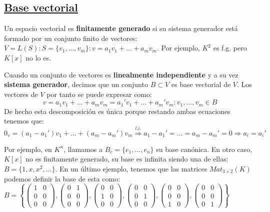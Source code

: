 \documentclass[10pt,a4paper,openright]{book}
\begin{document}
\subsection*{\underline{Base vectorial}}
Un espacio vectorial es \textbf{finitamente generado} si su sistema generador está formado por un conjunto finito de vectores: $V=L(S): S=\{v_1, ..., v_m\}: v=a_1v_1+ ... + a_mv_m$. Por ejemplo, $K^2$ es f.g. pero $K[x]$ no lo es.\par

Cuando un conjunto de vectores es \textbf{linealmente independiente} y a su vez \textbf{sistema generador}, decimos que un conjunto $B\subset V$ es base vectorial de $V$. Los vectores de $V$ por tanto se puede expresar como:
$$v=a_1v_1+...+a_mv_m=a_1'v_1+...+a_m'v_m: v_1, ..., v_m\in B$$
De hecho esta descomposición es única porque restando ambas ecuaciones tenemos que:
$$0_v=(a_1-a_1')v_1+...+(a_m-a_m')v_m\stackrel{l.i.}{\Rightarrow} a_1-a_1'=...=a_m-a_m'=0\Rightarrow a_i=a_i'$$

Por ejemplo, en $K^n$, llamamos a $B_c=\{e_1, ..., e_n\}$ su base canónica. En otro caso, $K[x]$ no es finitamente generado, su base es infinita siendo una de ellas: $B=\{1, x, x^2, ...\}$. En un último ejemplo, tenemos que las matrices $Mat_{3\times 2}(K)$ podemos definir la base de esta como: $B=\left\lbrace\left(\begin{array}{cc}1 & 0 \\ 0 & 0 \\ 0 & 0 \end{array}\right), \left(\begin{array}{cc}0 & 1 \\ 0 & 0 \\ 0 & 0 \end{array}\right), \left(\begin{array}{cc}0 & 0 \\ 1 & 0 \\ 0 & 0 \end{array}\right), \left(\begin{array}{cc}0 & 0 \\ 0 & 1 \\ 0 & 0 \end{array}\right), \left(\begin{array}{cc}0 & 0 \\ 0 & 0 \\ 1 & 0 \end{array}\right), \left(\begin{array}{cc}0 & 0 \\ 0 & 0 \\ 0 & 1 \end{array}\right)\right\rbrace$
\end{document}
